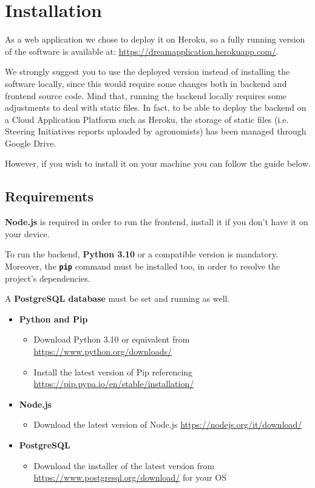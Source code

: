 \documentclass[table, 12pt]{article}
\begin{document}
\section{Installation}
As a web application we chose to deploy it on Heroku, so
a fully running version of the software is available at:\newline
\url{https://dreamapplication.herokuapp.com/}.

We strongly suggest you to use the deployed version instead of installing the software locally, since this would require some changes both in backend and frontend source code.
Mind that, running the backend locally requires some adjustments to deal with static files. In fact, to be able to deploy the backend on a Cloud Application Platform such as Heroku, the storage of static files (i.e. Steering Initiatives reports uploaded by agronomists) has been managed through Google Drive. 

However, if you wish to install it on your machine you can follow the guide below. 

\subsection{Requirements}
\textbf{Node.js} is required in order to run the frontend, install it if you don't
have it on your device.

To run the backend, \textbf{Python 3.10} or a compatible version is mandatory. Moreover, the \texttt {\textbf{pip}} command must be installed too, in order to resolve the project's dependencies. 

A \textbf{PostgreSQL database} must be set and running as well.

\begin{itemize}
    \item \textbf{Python and Pip}
    \begin{itemize}
        \item Download Python 3.10 or equivalent from \url{https://www.python.org/downloads/}
        \item Install the latest version of Pip referencing \url{https://pip.pypa.io/en/stable/installation/}
    \end{itemize}
    \item \textbf{Node.js}
    \begin{itemize}
        \item Download the latest version of Node.js \url{https://nodejs.org/it/download/}
    \end{itemize}
    \item \textbf{PostgreSQL}
    \begin{itemize}
        \item Download the installer of the latest version from \url{https://www.postgresql.org/download/} for your OS
    \end{itemize}
\end{itemize}
\end{document}
